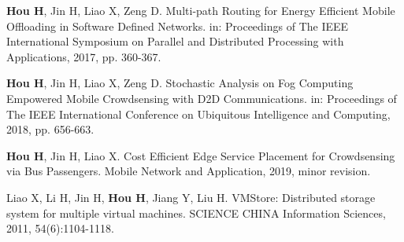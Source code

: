\documentclass[format=draft,language=chinese,degree=phd,table,usenames,dvipsnames]{hustthesis}
\begin{document}
\begin{publications}
\item \textbf{Hou H}, Jin H, Liao X, Zeng D. Multi-path Routing for Energy Efficient Mobile Offloading in Software Defined Networks. in: Proceedings of The IEEE International Symposium on Parallel and Distributed Processing with Applications, 2017, pp. 360-367. %
\item \textbf{Hou H}, Jin H, Liao X, Zeng D. Stochastic Analysis on Fog Computing Empowered Mobile Crowdsensing with D2D Communications. in: Proceedings of The IEEE International Conference on Ubiquitous Intelligence and Computing, 2018, pp. 656-663. %
\item \textbf{Hou H}, Jin H, Liao X. Cost Efficient Edge Service Placement for Crowdsensing via Bus Passengers. Mobile Network and Application, 2019, minor revision.
\item Liao X, Li H, Jin H, \textbf{Hou H}, Jiang Y, Liu H. VMStore: Distributed storage system for multiple virtual machines. SCIENCE CHINA Information Sciences, 2011, 54(6):1104-1118. %

\end{publications}
\end{document}
